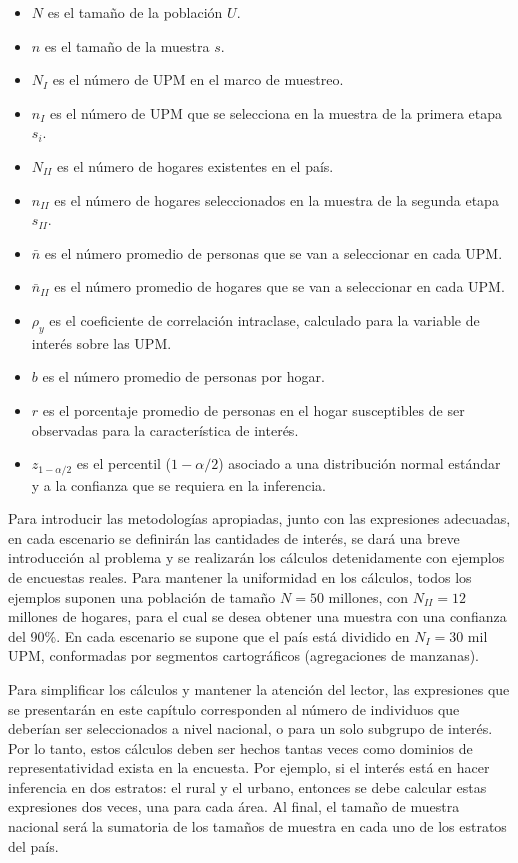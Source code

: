 \documentclass[
  12pt,
  spanish,
]{book}
\providecommand{\tightlist}{%
  \setlength{\itemsep}{0pt}\setlength{\parskip}{0pt}}
\begin{document}
\begin{itemize}
\tightlist
\item
  \(N\) es el tamaño de la población \(U\).
\item
  \(n\) es el tamaño de la muestra \(s\).
\item
  \(N_{I}\) es el número de UPM en el marco de muestreo.
\item
  \(n_{I}\) es el número de UPM que se selecciona en la muestra de la primera etapa \(s_i\).
\item
  \(N_{II}\) es el número de hogares existentes en el país.
\item
  \(n_{II}\) es el número de hogares seleccionados en la muestra de la segunda etapa \(s_{II}\).
\item
  \(\bar{n}\) es el número promedio de personas que se van a seleccionar en cada UPM.
\item
  \(\bar{n}_{II}\) es el número promedio de hogares que se van a seleccionar en cada UPM.
\item
  \(\rho_y\) es el coeficiente de correlación intraclase, calculado para la variable de interés sobre las UPM.
\item
  \(b\) es el número promedio de personas por hogar.
\item
  \(r\) es el porcentaje promedio de personas en el hogar susceptibles de ser observadas para la característica de interés.
\item
  \(z_{1-\alpha/2}\) es el percentil (\(1- \alpha/2\)) asociado a una distribución normal estándar y a la confianza que se requiera en la inferencia.
\end{itemize}

Para introducir las metodologías apropiadas, junto con las expresiones adecuadas, en cada escenario se definirán las cantidades de interés, se dará una breve introducción al problema y se realizarán los cálculos detenidamente con ejemplos de encuestas reales. Para mantener la uniformidad en los cálculos, todos los ejemplos suponen una población de tamaño \(N=50\) millones, con \(N_{II} = 12\) millones de hogares, para el cual se desea obtener una muestra con una confianza del 90\%. En cada escenario se supone que el país está dividido en \(N_{I} =30\) mil UPM, conformadas por segmentos cartográficos (agregaciones de manzanas).

Para simplificar los cálculos y mantener la atención del lector, las expresiones que se presentarán en este capítulo corresponden al número de individuos que deberían ser seleccionados a nivel nacional, o para un solo subgrupo de interés. Por lo tanto, estos cálculos deben ser hechos tantas veces como dominios de representatividad exista en la encuesta. Por ejemplo, si el interés está en hacer inferencia en dos estratos: el rural y el urbano, entonces se debe calcular estas expresiones dos veces, una para cada área. Al final, el tamaño de muestra nacional será la sumatoria de los tamaños de muestra en cada uno de los estratos del país.
\end{document}
